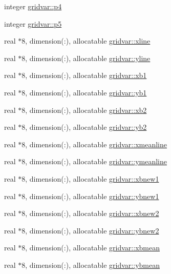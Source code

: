 \begin{DoxyCompactItemize}
integer \hyperlink{namespacegridvar_af879defcd34121964abce7fb5f06c1e5}{gridvar\+::p4}
\item 
integer \hyperlink{namespacegridvar_aeeca5c7ff039fec86cfa5159ba5dfaa9}{gridvar\+::p5}
\item 
real $\ast$8, dimension(\+:), allocatable \hyperlink{namespacegridvar_ad36217840661114bf87efd88b8e0ef9f}{gridvar\+::xline}
\item 
real $\ast$8, dimension(\+:), allocatable \hyperlink{namespacegridvar_a50e8fc927e6dd816267bc2eb8e20283f}{gridvar\+::yline}
\item 
real $\ast$8, dimension(\+:), allocatable \hyperlink{namespacegridvar_ac19951c0ef8b36fd21139054f5e224e2}{gridvar\+::xb1}
\item 
real $\ast$8, dimension(\+:), allocatable \hyperlink{namespacegridvar_a330cf63f1dec7b8eb31c4d643cfa9c07}{gridvar\+::yb1}
\item 
real $\ast$8, dimension(\+:), allocatable \hyperlink{namespacegridvar_a66083c9a2a9d76f40ec6db31fe43e4aa}{gridvar\+::xb2}
\item 
real $\ast$8, dimension(\+:), allocatable \hyperlink{namespacegridvar_af5cc21dee8d110e0ae7ce0e1370920cc}{gridvar\+::yb2}
\item 
real $\ast$8, dimension(\+:), allocatable \hyperlink{namespacegridvar_ad19621a7f5affe93e33f8a58730527ca}{gridvar\+::xmeanline}
\item 
real $\ast$8, dimension(\+:), allocatable \hyperlink{namespacegridvar_a7fb5eedd8e1bc9b66181f2cc2e461c0c}{gridvar\+::ymeanline}
\item 
real $\ast$8, dimension(\+:), allocatable \hyperlink{namespacegridvar_a53c057251ce468ac480e633a8872773a}{gridvar\+::xbnew1}
\item 
real $\ast$8, dimension(\+:), allocatable \hyperlink{namespacegridvar_a3f092d48897bcc3226b7c2fe84823bea}{gridvar\+::ybnew1}
\item 
real $\ast$8, dimension(\+:), allocatable \hyperlink{namespacegridvar_af05e411d94cae29c5a5ac414c9d43621}{gridvar\+::xbnew2}
\item 
real $\ast$8, dimension(\+:), allocatable \hyperlink{namespacegridvar_a8f285d1c92532af25a64aa36f934796e}{gridvar\+::ybnew2}
\item 
real $\ast$8, dimension(\+:), allocatable \hyperlink{namespacegridvar_acee1a1e22370f51e5af53bda6cdececc}{gridvar\+::xbmean}
\item 
real $\ast$8, dimension(\+:), allocatable \hyperlink{namespacegridvar_ae4e494722edb427de657fb301c02d39b}{gridvar\+::ybmean}

\end{DoxyCompactItemize}
